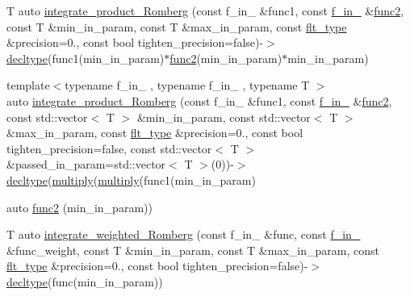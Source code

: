 \begin{DoxyCompactItemize}
\item 
T auto \hyperlink{namespaceIceBRG_a67f78e65357664f5e9019db9cf5f555e}{integrate\-\_\-product\-\_\-\-Romberg} (const f\-\_\-in\-\_ \&func1, const \hyperlink{namespaceIceBRG_adc45d5d0dcb62999139c819c97077451}{f\-\_\-in\-\_} \&\hyperlink{namespaceIceBRG_a26f5c1539710bf77e731d964fc5ac5bb}{func2}, const T \&min\-\_\-in\-\_\-param, const T \&max\-\_\-in\-\_\-param, const \hyperlink{lib_2IceBRG__main_2common_8h_ad0f130a56eeb944d9ef2692ee881ecc4}{flt\-\_\-type} \&precision=0., const bool tighten\-\_\-precision=false)-\/$>$ \hyperlink{namespaceIceBRG_a528e5024ecab03049320529180ae84a8}{decltype}(func1(min\-\_\-in\-\_\-param)$\ast$\hyperlink{namespaceIceBRG_a26f5c1539710bf77e731d964fc5ac5bb}{func2}(min\-\_\-in\-\_\-param)$\ast$min\-\_\-in\-\_\-param)
\item 
{\footnotesize template$<$typename f\-\_\-in\-\_ , typename f\-\_\-in\-\_ , typename T $>$ }\\auto \hyperlink{namespaceIceBRG_adac863d65cb941e31b127f9e1b1b1a14}{integrate\-\_\-product\-\_\-\-Romberg} (const f\-\_\-in\-\_ \&func1, const \hyperlink{namespaceIceBRG_adc45d5d0dcb62999139c819c97077451}{f\-\_\-in\-\_} \&\hyperlink{namespaceIceBRG_a26f5c1539710bf77e731d964fc5ac5bb}{func2}, const std\-::vector$<$ T $>$ \&min\-\_\-in\-\_\-param, const std\-::vector$<$ T $>$ \&max\-\_\-in\-\_\-param, const \hyperlink{lib_2IceBRG__main_2common_8h_ad0f130a56eeb944d9ef2692ee881ecc4}{flt\-\_\-type} \&precision=0., const bool tighten\-\_\-precision=false, const std\-::vector$<$ T $>$ \&passed\-\_\-in\-\_\-param=std\-::vector$<$ T $>$(0))-\/$>$ \hyperlink{namespaceIceBRG_a528e5024ecab03049320529180ae84a8}{decltype}(\hyperlink{namespaceIceBRG_ab535c998baac3ffc8412fdbae750b7d1}{multiply}(\hyperlink{namespaceIceBRG_ab535c998baac3ffc8412fdbae750b7d1}{multiply}(func1(min\-\_\-in\-\_\-param)
\item 
auto \hyperlink{namespaceIceBRG_a26f5c1539710bf77e731d964fc5ac5bb}{func2} (min\-\_\-in\-\_\-param))
\item 
T auto \hyperlink{namespaceIceBRG_a0acbac239138d461fded71903189abc0}{integrate\-\_\-weighted\-\_\-\-Romberg} (const f\-\_\-in\-\_ \&func, const \hyperlink{namespaceIceBRG_adc45d5d0dcb62999139c819c97077451}{f\-\_\-in\-\_} \&func\-\_\-weight, const T \&min\-\_\-in\-\_\-param, const T \&max\-\_\-in\-\_\-param, const \hyperlink{lib_2IceBRG__main_2common_8h_ad0f130a56eeb944d9ef2692ee881ecc4}{flt\-\_\-type} \&precision=0., const bool tighten\-\_\-precision=false)-\/$>$ \hyperlink{namespaceIceBRG_a528e5024ecab03049320529180ae84a8}{decltype}(func(min\-\_\-in\-\_\-param))

\end{DoxyCompactItemize}
